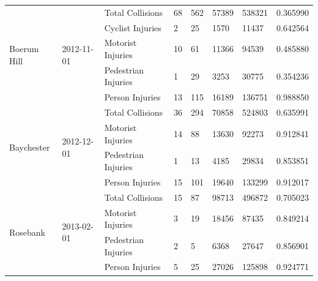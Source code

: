 \documentclass[10pt,journal,compsoc]{IEEEtran}
\begin{document}
\begin{table}[]
\begin{tabular}{|l|l|l|l|l|l|l|l|}
\multirow{5}{*}{Boerum Hill}                   & \multirow{5}{*}{2012-11-01} & Total Collisions    & 68        & 562      & 57389      & 538321    & 0.365990 \\ \cline{3-8} 
                                               &                             & Cyclist Injuries    & 2         & 25       & 1570       & 11437     & 0.642564 \\ \cline{3-8} 
                                               &                             & Motorist Injuries   & 10        & 61       & 11366      & 94539     & 0.485880 \\ \cline{3-8} 
                                               &                             & Pedestrian Injuries & 1         & 29       & 3253       & 30775     & 0.354236 \\ \cline{3-8} 
                                               &                             & Person Injuries     & 13        & 115      & 16189      & 136751    & 0.988850 \\ \hline
\multirow{4}{*}{Baychester}                    & \multirow{4}{*}{2012-12-01} & Total Collisions    & 36        & 294      & 70858      & 524803    & 0.635991 \\ \cline{3-8} 
                                               &                             & Motorist Injuries   & 14        & 88       & 13630      & 92273     & 0.912841 \\ \cline{3-8} 
                                               &                             & Pedestrian Injuries & 1         & 13       & 4185       & 29834     & 0.853851 \\ \cline{3-8} 
                                               &                             & Person Injuries     & 15        & 101      & 19640      & 133299    & 0.912017 \\ \hline
\multirow{4}{*}{Rosebank}                      & \multirow{4}{*}{2013-02-01} & Total Collisions    & 15        & 87       & 98713      & 496872    & 0.705023 \\ \cline{3-8} 
                                               &                             & Motorist Injuries   & 3         & 19       & 18456      & 87435     & 0.849214 \\ \cline{3-8} 
                                               &                             & Pedestrian Injuries & 2         & 5        & 6368       & 27647     & 0.856901 \\ \cline{3-8} 
                                               &                             & Person Injuries     & 5         & 25       & 27026      & 125898    & 0.924771 \\ \hline

\end{tabular}
\end{table}
\end{document}
